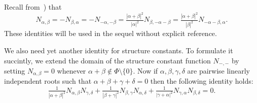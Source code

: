 \documentclass{article}
\numberwithin{equation}{section}
\theoremstyle{definition}
\theoremstyle{remark}
\begin{document}
Recall from~\cite[\S~14]{VP}) that
\begin{equation} \label{eq:sc-ids-sl} N_{\alpha, \beta} = -N_{\beta,\alpha} = - N_{-\alpha, -\beta} = \tfrac{|\alpha+\beta|^2}{|\alpha|^2} N_{\beta, -\alpha-\beta} = \tfrac{|\alpha+\beta|^2}{|\beta|^2} N_{-\alpha-\beta, \alpha}. \end{equation}
These identities will be used in the sequel without explicit reference. 

We also need yet another identity for structure constants.
To formulate it succintly, we extend the domain of the structure constant function $N_{-,-}$ by setting $N_{\alpha, \beta} = 0$ whenever $\alpha+\beta\not\in\Phi\setminus\{0\}$.
Now if $\alpha, \beta, \gamma, \delta$ are pairwise linearly independent roots such that $\alpha+\beta+\gamma+\delta = 0$ then the following identity holds:
\begin{equation} \label{eq:cocycle} \tfrac{1}{|\alpha+\beta|^2} N_{\alpha,\beta} N_{\gamma,\delta} + \tfrac{1}{|\beta+\gamma|^2} N_{\beta,\gamma} N_{\alpha,\delta} + \tfrac{1}{|\gamma+\alpha|^2} N_{\gamma,\alpha} N_{\beta,\delta} = 0. \end{equation}
\end{document}
